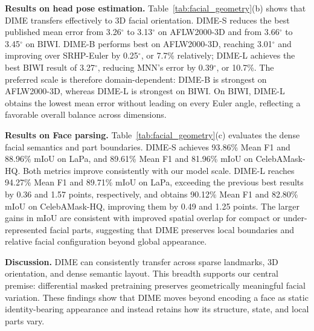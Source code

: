 \documentclass[10pt,journal,compsoc]{IEEEtran}
\begin{document}
\noindent\textbf{Results on head pose estimation.} Table~\ref{tab:facial_geometry}(b) shows that DIME transfers effectively to 3D facial orientation. DIME-S reduces the best published mean error from 3.26$^\circ$ to 3.13$^\circ$ on AFLW2000-3D and from 3.66$^\circ$ to 3.45$^\circ$ on BIWI. DIME-B performs best on AFLW2000-3D, reaching 3.01$^\circ$ and improving over SRHP-Euler by 0.25$^\circ$, or 7.7\% relatively; DIME-L achieves the best BIWI result of 3.27$^\circ$, reducing MNN's error by 0.39$^\circ$, or 10.7\%. The preferred scale is therefore domain-dependent: DIME-B is strongest on AFLW2000-3D, whereas DIME-L is strongest on BIWI. On BIWI, DIME-L obtains the lowest mean error without leading on every Euler angle, reflecting a favorable overall balance across dimensions.

\noindent\textbf{Results on Face parsing.} Table~\ref{tab:facial_geometry}(c) evaluates the dense facial semantics and part boundaries. DIME-S achieves 93.86\% Mean F1 and 88.96\% mIoU on LaPa, and 89.61\% Mean F1 and 81.96\% mIoU on CelebAMask-HQ. Both metrics improve consistently with our model scale. DIME-L reaches 94.27\% Mean F1 and 89.71\% mIoU on LaPa, exceeding the previous best results by 0.36 and 1.57 points, respectively, and obtains 90.12\% Mean F1 and 82.80\% mIoU on CelebAMask-HQ, improving them by 0.49 and 1.25 points. The larger gains in mIoU are consistent with improved spatial overlap for compact or under-represented facial parts, suggesting that DIME preserves local boundaries and relative facial configuration beyond global appearance.

\noindent\textbf{Discussion.} DIME can consistently transfer across sparse landmarks, 3D orientation, and dense semantic layout. This breadth supports our central premise: differential masked pretraining preserves geometrically meaningful facial variation. These findings show that DIME moves beyond encoding a face as static identity-bearing appearance and instead retains how its structure, state, and local parts vary.
\end{document}
